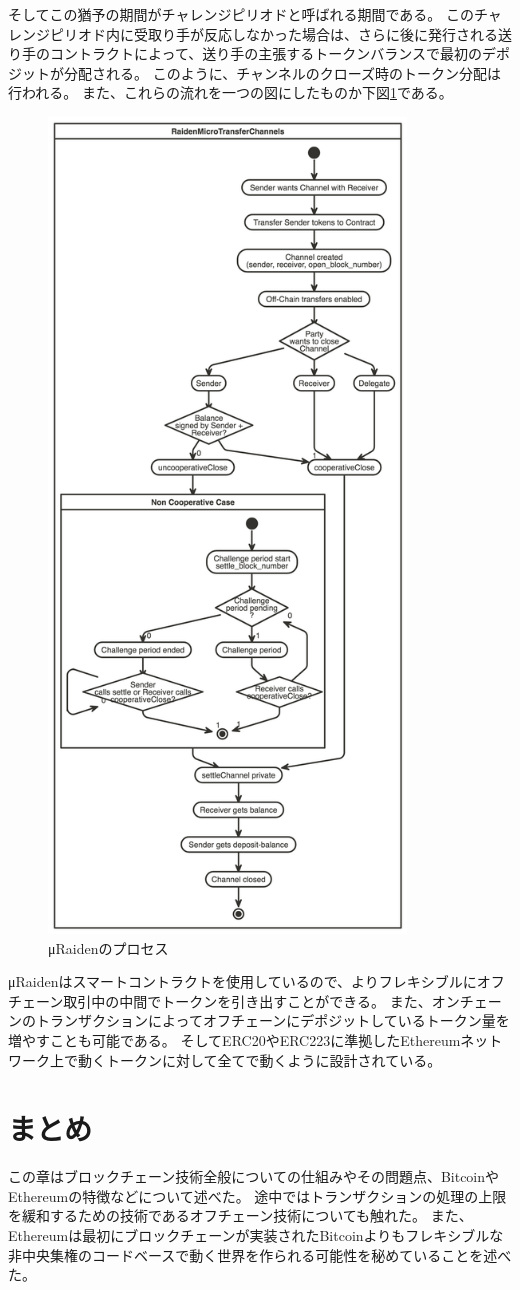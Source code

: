 そしてこの猶予の期間がチャレンジピリオドと呼ばれる期間である。
このチャレンジピリオド内に受取り手が反応しなかった場合は、さらに後に発行される送り手のコントラクトによって、送り手の主張するトークンバランスで最初のデポジットが分配される。
このように、チャンネルのクローズ時のトークン分配は行われる。
また、これらの流れを一つの図にしたものか下図\ref{ChannelCycle}である。
\begin{figure}[htbp]
 \centering
  \includegraphics[width=95mm]{image/ChannelCycle.png}
 \caption{μRaidenのプロセス}
 \label{ChannelCycle}
\end{figure}
μRaidenはスマートコントラクトを使用しているので、よりフレキシブルにオフチェーン取引中の中間でトークンを引き出すことができる。
また、オンチェーンのトランザクションによってオフチェーンにデポジットしているトークン量を増やすことも可能である。
そしてERC20やERC223に準拠したEthereumネットワーク上で動くトークンに対して全てで動くように設計されている。

\section{まとめ}
この章はブロックチェーン技術全般についての仕組みやその問題点、BitcoinやEthereumの特徴などについて述べた。
途中ではトランザクションの処理の上限を緩和するための技術であるオフチェーン技術についても触れた。
また、Ethereumは最初にブロックチェーンが実装されたBitcoinよりもフレキシブルな非中央集権のコードベースで動く世界を作られる可能性を秘めていることを述べた。